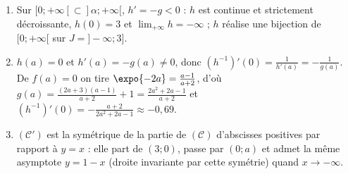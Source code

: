 \begin{corrige}
\begin{sol}
\begin{description}
\begin{enumerate}
\begin{enumerate}
            \item Sur $[0 ; +\infty[ \subset ]\alpha ; +\infty[$, $h' = -g < 0$ : $h$ est continue et strictement d\'ecroissante,
                  $h(0) = 3$ et $\lim_{+\infty} h = -\infty$ ; $h$ r\'ealise une bijection de $[0 ; +\infty[$ sur $\boxed{J = ]-\infty ; 3]}$.
            \item $h(a) = 0$ et $h'(a) = -g(a) \neq 0$, donc $(h^{-1})'(0) = \frac{1}{h'(a)} = -\frac{1}{g(a)}$.
                  De $f(a) = 0$ on tire $\expo{-2a} = \frac{a - 1}{a + 2}$, d'o\`u
                  $g(a) = \frac{(2a+3)(a-1)}{a+2} + 1 = \frac{2a^2 + 2a - 1}{a + 2}$ et
                  $\boxed{(h^{-1})'(0) = -\frac{a + 2}{2a^2 + 2a - 1}} \approx -0{,}69$.
            \item $(\mathscr{C}')$ est la sym\'etrique de la partie de $(\mathscr{C})$ d'abscisses positives par rapport \`a $y = x$ :
                  elle part de $(3 ; 0)$, passe par $(0 ; a)$ et admet la m\^eme asymptote $y = 1 - x$ (droite invariante par cette sym\'etrie)
                  quand $x \to -\infty$.
            \end{enumerate}
      \end{enumerate}
\end{description}
\end{sol}


\end{corrige}
